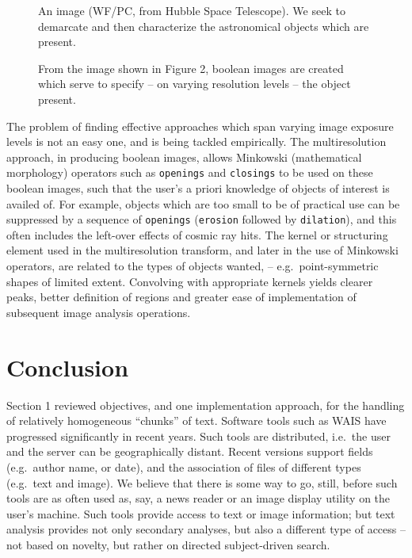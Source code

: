 \begin{figure}
\vskip 6cm
\caption{An image (WF/PC, from Hubble Space Telescope).  We seek to 
demarcate and then characterize the astronomical objects which are present.}
\end{figure}

\begin{figure}
\vskip 6cm
\caption{From the image shown in Figure 2, boolean images are created which
serve to specify  -- on varying resolution levels -- the object present.}
\end{figure}

The problem
of finding effective approaches which span varying image exposure levels is
not an easy one, and is being tackled empirically.  The multiresolution 
approach, in producing boolean images, allows Minkowski (mathematical
morphology) operators  such as {\tt openings} and {\tt closings} 
to be used on these
boolean images, such that the user's a priori knowledge of objects of interest
is availed of.  For example, objects which are too small to be of practical
use can be suppressed by a sequence of {\tt openings} ({\tt erosion} followed 
by {\tt dilation}),
and this often includes the left-over effects of cosmic ray hits.  The 
kernel or structuring element used in the multiresolution transform, and 
later in the use of Minkowski operators, are related to the types of objects
wanted, -- e.g.\ point-symmetric shapes of limited extent.  Convolving with 
appropriate kernels yields clearer peaks, better definition of regions and
greater ease of implementation of subsequent image analysis operations.


\section{Conclusion}

Section 1 reviewed objectives, and one implementation approach, for the 
handling of relatively homogeneous ``chunks'' of text.  Software tools such 
as WAIS have progressed significantly in recent years.  Such tools are
distributed, i.e.\ the user and the server can be geographically distant.
Recent versions support fields (e.g.\ author name, or date), and the 
association of files of different types (e.g.\ text and image).  We believe 
that there is some way to go, still, before such tools are as often used
as, say, a news reader or an image display utility on the user's machine.  
Such tools provide access to text or image information; but text analysis
provides not only secondary analyses, but also a different type of access --
not based on novelty, but rather on directed subject-driven search.

